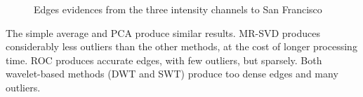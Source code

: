 \documentclass[journal]{IEEEtran}
\begin{document}
   \begin{figure}[hbt]
	\centering
     \caption{Edges evidences from the three intensity channels to San Francisco}
     \label{evidencias_sf_hh_hv_vv} 
   \end{figure}



The simple average and PCA produce similar results.
MR-SVD produces considerably less outliers than the other methods, at the cost of longer processing time.
ROC produces accurate edges, with few outliers, but sparsely. 
Both wavelet-based methods (DWT and SWT) produce too dense edges and many outliers.
\end{document}
